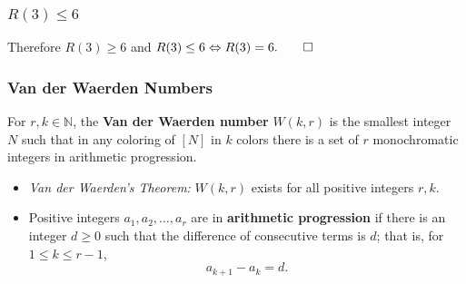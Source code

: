 \documentclass{beamer}
\begin{document}
\begin{frame}
	\frametitle{\( R(3) \leq 6 \)}
    \begin{figure}
        \centering
    \end{figure}
Therefore \( R(3) \geq 6 \) and \( R(3) \leq 6 \Leftrightarrow R(3) = 6. \qed \)
\end{frame}

\begin{frame}
	\frametitle{Van der Waerden Numbers} For \( r, k \in \mathbb{N} \), the \textbf{Van der Waerden number} \( W(k,r) \) is the smallest integer \( N \) such that in any coloring of \( [N] \) in \( k \) colors there is a set of \( r \) monochromatic integers in arithmetic progression.
\begin{itemize}
	\item \emph{Van der Waerden's Theorem:} \( W(k,r) \) exists for all positive integers \( r,k\).
	\item Positive integers \( a_1, a_2, \hdots , a_{r}  \) are in \textbf{arithmetic progression} if there is an integer \( d \geq 0 \) such that the difference of consecutive terms is \( d \); that is, for \( 1 \leq k \leq r - 1 \), \[ a_{k+1} - a_{k} = d. \]
\end{itemize}
\end{frame}
\end{document}
